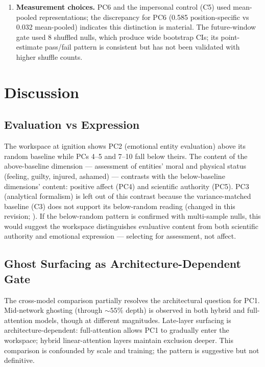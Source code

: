 \documentclass[11pt,a4paper]{article}
\begin{document}
\begin{enumerate}
  \item\label{lim:measurement} \textbf{Measurement choices.} PC6 and the impersonal control (C5) used mean-pooled representations; the discrepancy for PC6 (0.585 position-specific vs 0.032 mean-pooled) indicates this distinction is material. The future-window gate used 8 shuffled nulls, which produce wide bootstrap CIs; its point-estimate pass/fail pattern is consistent but has not been validated with higher shuffle counts.
\end{enumerate}

\section{Discussion}

\subsection{Evaluation vs Expression}

The workspace at ignition shows PC2 (emotional entity evaluation) above its random baseline while PCs 4--5 and 7--10 fall below theirs. The content of the above-baseline dimension --- assessment of entities' moral and physical status (feeling, guilty, injured, ashamed) --- contrasts with the below-baseline dimensions' content: positive affect (PC4) and scientific authority (PC5). PC3 (analytical formalism) is left out of this contrast because the variance-matched baseline (C3) does not support its below-random reading (changed in this revision; ). If the below-random pattern is confirmed with multi-sample nulls, this would suggest the workspace distinguishes evaluative content from both scientific authority and emotional expression --- selecting for assessment, not affect.

\subsection{Ghost Surfacing as Architecture-Dependent Gate}

The cross-model comparison partially resolves the architectural question for PC1. Mid-network ghosting (through ${\sim}55\%$ depth) is observed in both hybrid and full-attention models, though at different magnitudes. Late-layer surfacing is architecture-dependent: full-attention allows PC1 to gradually enter the workspace; hybrid linear-attention layers maintain exclusion deeper. This comparison is confounded by scale and training; the pattern is suggestive but not definitive.
\end{document}

